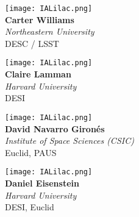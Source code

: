 \documentclass[10pt,letterpaper]{article}
\begin{document}
\begin{multicols}{2}
    \begin{minipage}[t][2in][c]{.45\textwidth}
    \centering
    \texttt{[image: IALilac.png]}\\
    \Huge \textbf{Carter Williams}\\
    \vspace{0.3cm}
    \Large \textit{Northeastern University} \\
    \vspace{0.5cm}
    \small DESC / LSST
    \end{minipage}
    \vspace{.5cm}
    
    \begin{minipage}[t][2in][c]{.45\textwidth}
    \centering
    \texttt{[image: IALilac.png]}\\
    \Huge \textbf{Claire Lamman}\\
    \vspace{0.3cm}
    \Large \textit{Harvard University} \\
    \vspace{0.5cm}
    \small DESI
    \end{minipage}
    \vspace{.5cm}
    
    \begin{minipage}[t][2in][c]{.45\textwidth}
    \centering
    \texttt{[image: IALilac.png]}\\
    \huge \textbf{David Navarro Gironés}\\
    \vspace{0.3cm}
    \Large \textit{Institute of Space Sciences (CSIC)} \\
    \vspace{0.5cm}
    \small Euclid, PAUS
    \end{minipage}
    \vspace{.5cm}
    
    \begin{minipage}[t][2in][c]{.45\textwidth}
    \centering
    \texttt{[image: IALilac.png]}\\
    \huge \textbf{Daniel Eisenstein}\\
    \vspace{0.3cm}
    \Large \textit{Harvard University} \\
    \vspace{0.5cm}
    \small DESI, Euclid
    \end{minipage}
    \vspace{.5cm}
    
\end{multicols}
\end{document}
